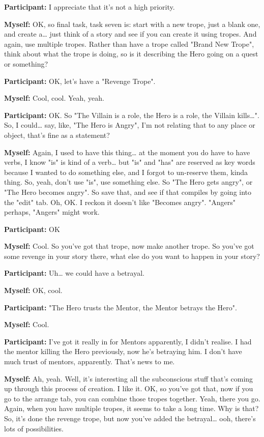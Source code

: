 \documentclass[11pt]{report}
\newcommand{\llabel}[1]{\hypertarget{llineno:#1}{\linelabel{#1}}}
\begin{document}
\begin{linenumbers}
\textbf{Participant:} I appreciate that it's not a high priority.

\textbf{Myself:} OK, so final task, task seven is: start with a new trope, just a blank one, and create a\ldots{} just think of a story and see if you can create it using tropes. And again, use multiple tropes. Rather than have a trope called "Brand New Trope", think about what the trope is doing, so is it describing the Hero going on a quest or something?

\textbf{Participant:} OK, let's have a "Revenge Trope".

\textbf{Myself:} Cool, cool. Yeah, yeah.

\textbf{Participant:} OK. So "The Villain is a role, the Hero is a role, the
Villain kills\ldots{}". So, I could\ldots{} say, like, "The Hero is Angry", I'm
not relating that to any place or object, that's fine as a
statement?\llabel{lne:feature2a3}

\textbf{Myself:} Again, I used to have this thing\ldots{} at the moment you do have to have verbs, I know "is" is kind of a verb\ldots{} but "is" and "has" are reserved as key words because I wanted to do something else, and I forgot to un-reserve them, kinda thing. So, yeah, don't use "is", use something else. So "The Hero gets angry", or "The Hero becomes angry". So save that, and see if that compiles by going into the "edit" tab. Oh, OK. I reckon it doesn't like "Becomes angry". "Angers" perhaps, "Angers" might work.

\textbf{Participant:} OK

\textbf{Myself:} Cool. So you've got that trope, now make another trope. So you've got some revenge in your story there, what else do you want to happen in your story?

\textbf{Participant:} Uh\ldots{} we could have a betrayal.

\textbf{Myself:} OK, cool.

\textbf{Participant:} "The Hero trusts the Mentor, the Mentor betrays the Hero".

\textbf{Myself:} Cool.

\textbf{Participant:} I've got it really in for Mentors apparently, I didn't realise. I had the mentor killing the Hero previously, now he's betraying him. I don't have much trust of mentors, apparently. That's news to me.

\textbf{Myself:} Ah, yeah. Well, it's interesting all the subconscious stuff that's coming up through this process of creation. I like it. OK, so you've got that, now if you go to the arrange tab, you can combine those tropes together. Yeah, there you go. Again, when you have multiple tropes, it seems to take a long time. Why is that? So, it's done the revenge trope, but now you've added the betrayal\ldots{} ooh, there's lots of possibilities.


\end{linenumbers}
\end{document}
